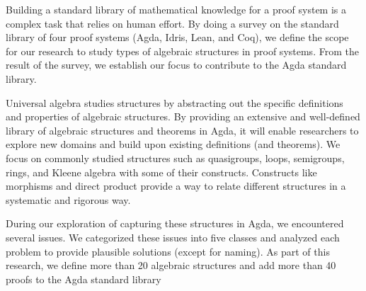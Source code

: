 Building a standard library of mathematical knowledge for a proof system is a
complex task that relies on human effort. By doing a survey on the standard library
of four proof systems (Agda, Idris, Lean, and Coq), we define the scope for our
research to study types of algebraic structures in proof systems. From the
result of the survey, we establish our focus to contribute to the Agda standard
library. 

Universal algebra studies structures by abstracting out the specific definitions
and properties of algebraic structures. By providing an extensive and
well-defined library of algebraic structures and theorems in Agda, it will
enable researchers to explore new domains and build upon existing definitions
(and theorems). We focus on commonly studied structures such as quasigroups,
loops, semigroups, rings, and Kleene algebra with some of their constructs.
Constructs like morphisms and direct product provide a way to relate different
structures in a systematic and rigorous way. 

During our exploration of capturing these structures in Agda, we encountered
several issues. We categorized these issues into five classes and analyzed each
problem to provide plausible solutions (except for naming). As part
of this research, we define more than 20 algebraic structures and add more than
40 proofs to the Agda standard library